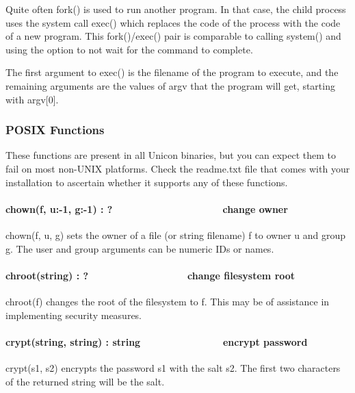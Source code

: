 Quite often fork() is used to run another program. In that case, the
child process uses the system call exec() which replaces the code of
the process with the code of a new program. This fork()/exec() pair is
comparable to calling system() and using the option to not wait for the
command to complete.

The first argument to exec() is the filename of the program to execute,
and the remaining arguments are the values of argv that the program
will get, starting with argv[0]. 


\subsubsection{POSIX Functions}
These functions are present in all Unicon binaries, but you can expect
them to fail on most non-UNIX platforms. Check the readme.txt file that
comes with your installation to ascertain whether it supports any of
these functions.

\paragraph[chown(f, u:{}-1, g:{}-1) : ?\ \ \ \ \ \ \ \ \ \ \ \ 
\ \ \ \ \ \ \ \ change owner]{chown(f, u:-1, g:-1) :
?\ \ \ \ \ \ \ \ \ \ \ \  \ \ \ \ \ \ \ \ change owner}
chown(f, u, g) sets the owner of a file (or string filename) f to owner
u and group g. The user and group arguments can be numeric
ID{\textquotesingle}s or names.

\paragraph[chroot(string) : ?\ \ \ \ \ \ \ \ \ \ \ \  \ \ \ \ \ \ change
filesystem root]{chroot(string) : ?\ \ \ \ \ \ \ \ \ \ \ \ 
\ \ \ \ \ \ change filesystem root}
chroot(f) changes the root of the filesystem to f. This may be of
assistance in implementing security measures.

\paragraph[crypt(string, string) : string\ \ \ \ \ \ \ \ \ \ \ \ 
\ \ \ encrypt password]{crypt(string, string) :
string\ \ \ \ \ \ \ \ \ \ \ \  \ \ \ encrypt password}
crypt(s1, s2) encrypts the password s1 with the salt s2. The first two
characters of the returned string will be the salt.

